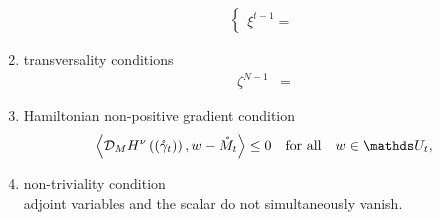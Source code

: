 \documentclass[12pt]{article}
\begin{document}
\begin{theorem}[{{\textcolor{blue}{Discrete-time PMP for a Lie Group Estimator}}}]
\begin{enumerate}[leftmargin=*, label={\rm (MP-\roman*)}, widest=iii, align=left]
\begin{align*}
\begin{cases}
\xi^{t-1} = 
\end{cases}
\end{align*}
\item \label{main:trans} transversality conditions
\begin{align*}
\zeta^{N-1}& = 
\end{align*}
\item \label{main:hmax} Hamiltonian non-positive gradient condition \label{it:hamnpg}
\[\ip{\mathcal{D}_{M} \ham{\left(\optraj{t}\right)}}{w-\op{M}_t} \leq 0 \quad \text{for all} \quad w \in \cset,\]
\item \label{main:ntriv} non-triviality condition \\
adjoint variables and the scalar \m{\nu} do not simultaneously vanish.
\end{enumerate}
\end{theorem}
 
 
%
% 
\end{document}
